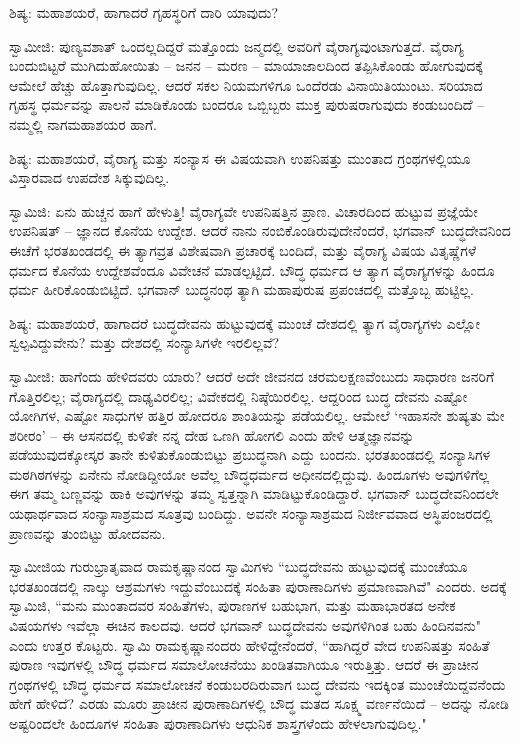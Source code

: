 ಶಿಷ್ಯ: ಮಹಾಶಯರೆ, ಹಾಗಾದರೆ ಗೃಹಸ್ಥರಿಗೆ ದಾರಿ ಯಾವುದು?

ಸ್ವಾಮೀಜಿ: ಪುಣ್ಯವಶಾತ್ ಒಂದಲ್ಲದಿದ್ದರೆ ಮತ್ತೊಂದು ಜನ್ಮದಲ್ಲಿ ಅವರಿಗೆ ವೈರಾಗ್ಯವುಂಟಾಗುತ್ತದೆ. ವೈರಾಗ್ಯ ಬಂದುಬಿಟ್ಟರೆ ಮುಗಿದುಹೋಯಿತು – ಜನನ – ಮರಣ – ಮಾಯಾಜಾಲದಿಂದ ತಪ್ಪಿಸಿಕೊಂಡು ಹೋಗುವುದಕ್ಕೆ ಆಮೇಲೆ ಹೆಚ್ಚು ಹೊತ್ತಾಗುವುದಿಲ್ಲ. ಆದರೆ ಸಕಲ ನಿಯಮಗಳಿಗೂ ಒಂದೆರಡು ವಿನಾಯಿತಿಯುಂಟು. ಸರಿಯಾದ ಗೃಹಸ್ಥ ಧರ್ಮವನ್ನು ಪಾಲನೆ ಮಾಡಿಕೊಂಡು ಬಂದರೂ ಒಬ್ಬಿಬ್ಬರು ಮುಕ್ತ ಪುರುಷರಾಗುವುದು ಕಂಡುಬಂದಿದೆ – ನಮ್ಮಲ್ಲಿ ನಾಗಮಹಾಶಯರ ಹಾಗೆ.

ಶಿಷ್ಯ: ಮಹಾಶಯರೆ, ವೈರಾಗ್ಯ ಮತ್ತು ಸಂನ್ಯಾಸ ಈ ವಿಷಯವಾಗಿ ಉಪನಿಷತ್ತು ಮುಂತಾದ ಗ್ರಂಥಗಳಲ್ಲಿಯೂ ವಿಸ್ತಾರವಾದ ಉಪದೇಶ ಸಿಕ್ಕುವುದಿಲ್ಲ.

ಸ್ವಾಮಿಜಿ: ಏನು ಹುಚ್ಚನ ಹಾಗೆ ಹೇಳುತ್ತಿ! ವೈರಾಗ್ಯವೇ ಉಪನಿಷತ್ತಿನ ಪ್ರಾಣ. ವಿಚಾರದಿಂದ ಹುಟ್ಟುವ ಪ್ರಜ್ಞೆಯೇ ಉಪನಿಷತ್ – ಜ್ಞಾನದ ಕೊನೆಯ ಉದ್ದೇಶ. ಆದರೆ ನಾನು ನಂಬಿಕೊಂಡಿರುವುದೇನೆಂದರೆ, ಭಗವಾನ್ ಬುದ್ಧದೇವನಿಂದ ಈಚೆಗೆ ಭರತಖಂಡದಲ್ಲಿ ಈ ತ್ಯಾಗವ್ರತ ವಿಶೇಷವಾಗಿ ಪ್ರಚಾರಕ್ಕೆ ಬಂದಿದೆ, ಮತ್ತು ವೈರಾಗ್ಯ ವಿಷಯ ವಿತೃಷ್ಣೆಗಳೆ ಧರ್ಮದ ಕೊನೆಯ ಉದ್ದೇಶವೆಂದೂ ವಿವೇಚನೆ ಮಾಡಲ್ಪಟ್ಟಿದೆ. ಬೌದ್ಧ ಧರ್ಮದ ಆ ತ್ಯಾಗ ವೈರಾಗ್ಯಗಳನ್ನು ಹಿಂದೂ ಧರ್ಮ ಹೀರಿಕೊಂಡುಬಿಟ್ಟಿದೆ. ಭಗವಾನ್ ಬುದ್ಧನಂಥ ತ್ಯಾಗಿ ಮಹಾಪುರುಷ ಪ್ರಪಂಚದಲ್ಲಿ ಮತ್ತೊಬ್ಬ ಹುಟ್ಟಿಲ್ಲ.

ಶಿಷ್ಯ: ಮಹಾಶಯರೆ, ಹಾಗಾದರೆ ಬುದ್ಧದೇವನು ಹುಟ್ಟುವುದಕ್ಕೆ ಮುಂಚೆ ದೇಶದಲ್ಲಿ ತ್ಯಾಗ ವೈರಾಗ್ಯಗಳು ಎಲ್ಲೋ ಸ್ವಲ್ಪವಿದ್ದುವೇನು? ಮತ್ತು ದೇಶದಲ್ಲಿ ಸಂನ್ಯಾಸಿಗಳೇ ಇರಲಿಲ್ಲವೆ?

ಸ್ವಾಮೀಜಿ: ಹಾಗೆಂದು ಹೇಳಿದವರು ಯಾರು? ಆದರೆ ಅದೇ ಜೀವನದ ಚರಮಲಕ್ಷಣವೆಂಬುದು ಸಾಧಾರಣ ಜನರಿಗೆ ಗೊತ್ತಿರಲಿಲ್ಲ; ವೈರಾಗ್ಯದಲ್ಲಿ ದಾಢ್ಯವಿರಲಿಲ್ಲ; ವಿವೇಕದಲ್ಲಿ ನಿಷ್ಠೆಯಿರಲಿಲ್ಲ. ಆದ್ದರಿಂದ ಬುದ್ಧ ದೇವನು ಎಷ್ಟೋ ಯೋಗಿಗಳ, ಎಷ್ಟೋ ಸಾಧುಗಳ ಹತ್ತಿರ ಹೋದರೂ ಶಾಂತಿಯನ್ನು ಪಡೆಯಲಿಲ್ಲ. ಆಮೇಲೆ ‘ಇಹಾಸನೇ ಶುಷ್ಯತು ಮೇ ಶರೀರಂ’ – ಈ ಆಸನದಲ್ಲಿ ಕುಳಿತೇ ನನ್ನ ದೇಹ ಒಣಗಿ ಹೋಗಲಿ ಎಂದು ಹೇಳಿ ಆತ್ಮಜ್ಞಾನವನ್ನು ಪಡೆಯುವುದಕ್ಕೋಸ್ಕರ ತಾನೇ ಕುಳಿತುಕೊಂಡುಬಿಟ್ಟು ಪ್ರಬುದ್ಧನಾಗಿ ಎದ್ದು ಬಂದನು. ಭರತಖಂಡದಲ್ಲಿ ಸಂನ್ಯಾಸಿಗಳ ಮಠಗಿಠಗಳನ್ನು ಏನೇನು ನೋಡಿದ್ದೀಯೋ ಅವೆಲ್ಲ ಬೌದ್ಧಧರ್ಮದ ಅಧೀನದಲ್ಲಿದ್ದುವು. ಹಿಂದೂಗಳು ಅವುಗಳಿಗೆಲ್ಲ ಈಗ ತಮ್ಮ ಬಣ್ಣವನ್ನು ಹಾಕಿ ಅವುಗಳನ್ನು ತಮ್ಮ ಸ್ವತ್ತನ್ನಾಗಿ ಮಾಡಿಟ್ಟುಕೊಂಡಿದ್ದಾರೆ. ಭಗವಾನ್ ಬುದ್ಧದೇವನಿಂದಲೇ ಯಥಾರ್ಥವಾದ ಸಂನ್ಯಾಸಾಶ್ರಮದ ಸೂತ್ರವು ಬಂದಿದ್ದು. ಅವನೇ ಸಂನ್ಯಾಸಾಶ್ರಮದ ನಿರ್ಜೀವವಾದ ಅಸ್ಥಿಪಂಜರದಲ್ಲಿ ಪ್ರಾಣವನ್ನು ತುಂಬಿಟ್ಟು ಹೋದವನು.

ಸ್ವಾಮೀಜಿಯ ಗುರುಭ್ರಾತೃವಾದ ರಾಮಕೃಷ್ಣಾನಂದ ಸ್ವಾಮಿಗಳು “ಬುದ್ಧದೇವನು ಹುಟ್ಟುವುದಕ್ಕೆ ಮುಂಚೆಯೂ ಭರತಖಂಡದಲ್ಲಿ ನಾಲ್ಕು ಆಶ್ರಮಗಳು ಇದ್ದುವೆಂಬುದಕ್ಕೆ ಸಂಹಿತಾ ಪುರಾಣಾದಿಗಳು ಪ್ರಮಾಣವಾಗಿವೆ" ಎಂದರು. ಅದಕ್ಕೆ ಸ್ವಾಮಿಜಿ, “ಮನು ಮುಂತಾದವರ ಸಂಹಿತೆಗಳು, ಪುರಾಣಗಳ ಬಹುಭಾಗ, ಮತ್ತು ಮಹಾಭಾರತದ ಅನೇಕ ವಿಷಯಗಳು ಇವೆಲ್ಲಾ ಈಚಿನ ಕಾಲದವು. ಆದರೆ ಭಗವಾನ್ ಬುದ್ಧದೇವನು ಅವುಗಳಿಗಿಂತ ಬಹು ಹಿಂದಿನವನು" ಎಂದು ಉತ್ತರ ಕೊಟ್ಟರು. ಸ್ವಾಮಿ ರಾಮಕೃಷ್ಣಾನಂದರು ಹೇಳಿದ್ದೇನೆಂದರೆ, “ಹಾಗಿದ್ದರೆ ವೇದ ಉಪನಿಷತ್ತು ಸಂಹಿತೆ ಪುರಾಣ ಇವುಗಳಲ್ಲಿ ಬೌದ್ಧ ಧರ್ಮದ ಸಮಾಲೋಚನೆಯು ಖಂಡಿತವಾಗಿಯೂ ಇರುತ್ತಿತ್ತು. ಆದರೆ ಈ ಪ್ರಾಚೀನ ಗ್ರಂಥಗಳಲ್ಲಿ ಬೌದ್ಧ ಧರ್ಮದ ಸಮಾಲೋಚನೆ ಕಂಡುಬರದಿರುವಾಗ ಬುದ್ಧ ದೇವನು ಇದಕ್ಕಿಂತ ಮುಂಚೆಯಿದ್ದವನೆಂದು ಹೇಗೆ ಹೇಳಿದೆ? ಎರಡು ಮೂರು ಪ್ರಾಚೀನ ಪುರಾಣಾದಿಗಳಲ್ಲಿ ಬೌದ್ಧ ಮತದ ಸೂಕ್ಷ್ಮ ವರ್ಣನೆಯಿದೆ – ಅದನ್ನು ನೋಡಿ ಅಷ್ಟರಿಂದಲೇ ಹಿಂದೂಗಳ ಸಂಹಿತಾ ಪುರಾಣಾದಿಗಳು ಆಧುನಿಕ ಶಾಸ್ತ್ರಗಳೆಂದು ಹೇಳಲಾಗುವುದಿಲ್ಲ."

